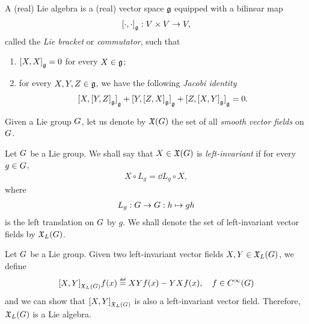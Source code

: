 \begin{definition}
    A (real) Lie algebra is a (real) vector space $\LieAlgebra$
    equipped with a bilinear map
    \begin{align*}
        \LieBracket \dummy \dummy : \VectorSpace \times \VectorSpace \to \VectorSpace,
    \end{align*}
    called the \emph{Lie bracket} or \emph{commutator},
    such that
    \begin{enumerate}
        \item $\LieBracket X X = 0$ for every $X \in \LieAlgebra$;
        \item for every $X, Y, Z \in \LieAlgebra$, we have the following \emph{Jacobi identity}
            \begin{align*}
                \LieBracket X {\LieBracket Y Z} +
                \LieBracket Y {\LieBracket Z X} +
                \LieBracket Z {\LieBracket X Y}
                = 0.
            \end{align*}
    \end{enumerate}
\end{definition}

Given a Lie group $\Group$,
let us denote by $\VectorFields$ the set of all \emph{smooth vector fields} on $\Group$.

\begin{definition}
    Let $\Group$ be a Lie group.
    We shall say that $X \in \VectorFields$ is \emph{left-invariant}
    if for every $g \in \Group$,
    \begin{align*}
        X \circ L_g = \dd L_g \circ X,
    \end{align*}
    where
    \begin{align*}
        L_g : \Group \to \Group : h \mapsto g h
    \end{align*}
    is the left translation on $\Group$ by $g$.
    We shall denote the set of left-invariant vector fields by $\LeftInvariantVectorFields$.
\end{definition}

\begin{example}
\label{example:Lie_algebra_of_left-invariant_vector_fields}
    Let $\Group$ be a Lie group.
    Given two left-invariant vector fields $X, Y \in \LeftInvariantVectorFields$,
    we define
    \begin{align*}
        \LieBracket [\LeftInvariantVectorFields] X Y f(x) \defeq X Y f(x) - Y X f(x),
        \quad f \in \SmoothFunctions \Group
    \end{align*}
    and we can show that $\LieBracket [\LeftInvariantVectorFields] X Y$ is also a left-invariant vector field.
    Therefore, $\LeftInvariantVectorFields$ is a Lie algebra.
\end{example}

